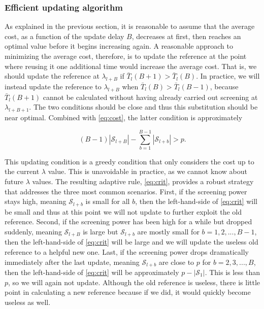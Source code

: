 \subsubsection{Efficient updating algorithm}

As explained in the previous section, it is reasonable to assume that the average cost, as a function of the update delay $B$, decreases at first, then reaches an optimal value before it begins increasing again. A reasonable approach to minimizing the average cost, therefore, is to update the reference at the point where reusing it one additional time would increase the average cost. That is, we should update the reference at $\lambda_{l+B}$ if $\bar{T}_l(B+1)>\bar{T}_l(B)$. In practice, we will instead update the reference to $\lambda_{l+B}$ when $\bar{T}_l(B)>\bar{T}_l(B-1)$, because $\bar{T}_l(B+1)$ cannot be calculated without having already carried out screening at $\lambda_{l+B+1}$. The two conditions should be close and thus this substitution should be near optimal. Combined with \eqref{eq:cost}, the latter condition is approximately

\begin{equation}
    \label{eq:crit}
    (B-1)|\mathcal{S}_{l+B}|-\sum_{b=1}^{B-1}|\mathcal{S}_{l+b}|>p.
\end{equation}


This updating condition is a greedy condition that only considers the cost up to the current $\lambda$ value. This is unavoidable in practice, as we cannot know about future $\lambda$ values. The resulting adaptive rule, \eqref{eq:crit}, provides a robust strategy that addresses the three most common scenarios. First, if the screening power stays high, meaning $\mathcal{S}_{l+b}$ is small for all $b$, then the left-hand-side of \eqref{eq:crit} will be small and thus at this point we will not update to further exploit the old reference. Second, if the screening power has been high for a while but dropped suddenly, meaning $\mathcal{S}_{l+B}$ is large but $\mathcal{S}_{l+b}$ are mostly small for $b=1,2,...,B-1$, then the left-hand-side of \eqref{eq:crit} will be large and we will update the useless old reference to a helpful new one. Last, if the screening power drops dramatically immediately after the last update, meaning $\mathcal{S}_{l+b}$ are close to $p$ for $b=2,3,...,B$, then the left-hand-side of \eqref{eq:crit} will be approximately $p-|\mathcal{S}_1|$. This is less than $p$, so we will again not update.  Although the old reference is useless, there is little point in calculating a new reference because if we did, it would quickly become useless as well.


